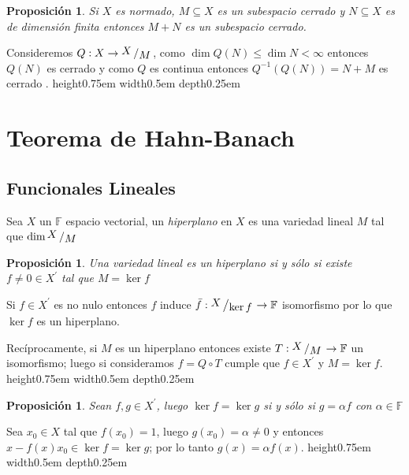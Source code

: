 \documentclass[11pt]{article}
\newcommand{\quotient}[2]{{\raisebox{.2em}{$#1$}\left/\raisebox{-.2em}{$#2$}\right.}}
\numberwithin{theorem}{subsection}
\newtheorem{proposition}[theorem]{Proposici\'on}
\newenvironment{proof}[1][Demostraci\'on]{\begin{trivlist}
		\item[\hskip \labelsep {\bfseries #1}]}{\end{trivlist}}
\newenvironment{definition}[1][Definici\'on]{\begin{trivlist}
		\item[\hskip \labelsep {\bfseries #1}]}{\end{trivlist}}
\newcommand{\qed}{\nobreak \ifvmode \relax \else
	\ifdim\lastskip<1.5em \hskip-\lastskip
	\hskip1.5em plus0em minus0.5em \fi \nobreak
	\vrule height0.75em width0.5em depth0.25em\fi}
\begin{document}
\begin{proposition}
	Si $X$ es normado, $M \subseteq X$ es un subespacio cerrado y $N \subseteq X$ es de dimensi\'on finita entonces $M+N$ es un subespacio cerrado.
\end{proposition}

\begin{proof}
	Consideremos $Q: X \rightarrow \quotient{X}{M}$, como $\dim Q(N) \leq \dim N < \infty $ entonces $Q(N)$ es cerrado y como $Q$ es continua entonces $Q^{-1}(Q(N)) = N+M$ es cerrado .\qed
\end{proof}

\section{Teorema de Hahn-Banach}

\subsection{Funcionales Lineales}

\begin{definition}
	Sea $X$ un $\mathbb{F}$ espacio vectorial, un \textit{hiperplano} en $X$ es una variedad lineal $M$ tal que $\dim \quotient{X}{M}$
\end{definition}

\begin{proposition}
	Una variedad lineal es un hiperplano si y s\'olo si existe $f \neq 0 \in X^{'}$ tal que $M = \ker f$
\end{proposition}

\begin{proof}
	Si $f \in X^{'}$ es no nulo entonces $f$ induce $\bar{f}: \quotient{X}{\ker f} \rightarrow \mathbb{F}$ isomorfismo por lo que $\ker f$ es un hiperplano.
	
	Rec\'iprocamente, si $M$ es un hiperplano entonces existe $T: \quotient{X}{M} \rightarrow \mathbb{F}$ un isomorfismo; luego si consideramos $f = Q \circ T$ cumple que $f \in X^{'}$ y $M = \ker f$. \qed
\end{proof}

\begin{proposition}
	\label{Dos funcionales con mismo nucleo son proporcionales}
	Sean $f,g \in X^{'}$, luego $\ker f = \ker g$ si y s\'olo si $g = \alpha f$ con $\alpha \in \mathbb{F}$
\end{proposition}

\begin{proof}
	Sea $x_0 \in X$ tal que $f(x_0) = 1$, luego $g(x_0) = \alpha \neq 0$ y entonces $x - f(x)x_0 \in \ker f = \ker g$; por lo tanto $g(x) = \alpha f(x)$. \qed
\end{proof}
\end{document}
